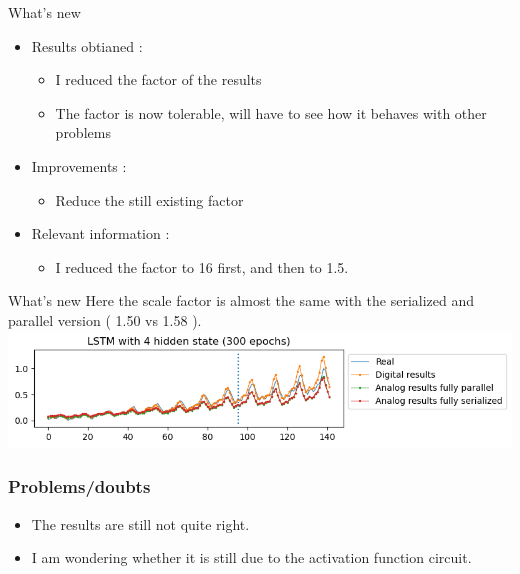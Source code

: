 \documentclass[table]{beamer}
\begin{document}
  \begin{frame}{What's new}
    \begin{itemize}
      \item Results obtianed :
        \begin{itemize}
            \color{text}
          \item I reduced the factor of the results
          \item The factor is now tolerable, will have to see how it behaves with other problems
        \end{itemize}
      \item Improvements :
        \begin{itemize}
            \color{text}
          \item Reduce the still existing factor
        \end{itemize}
      \item Relevant information :
        \begin{itemize}
            \color{text}
          \item I reduced the factor to 16 first, and then to 1.5.
        \end{itemize}
    \end{itemize}
  \end{frame}

  \begin{frame}{What's new}
    Here the scale factor is almost the same with the serialized and parallel version ( 1.50 vs 1.58 ).
    \includegraphics[width=\textwidth]{output/factor1.5.png}
  \end{frame}

  \begin{frame}
    \frametitle{Problems/doubts}
    \begin{itemize}
      \item The results are still not quite right.
      \item I am wondering whether it is still due to the activation function circuit.
    \end{itemize}
  \end{frame}
\end{document}
